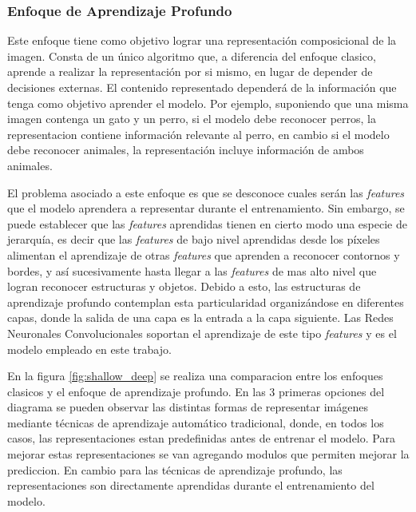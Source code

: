 \documentclass[a4paper,11pt,spanish]{book}
\begin{document}
      \subsubsection{Enfoque de Aprendizaje Profundo}
	Este enfoque tiene como objetivo lograr una representación composicional de la imagen. Consta de un único algoritmo que, a diferencia del enfoque clasico, aprende a realizar 
	la representación por si mismo, en lugar de depender de decisiones externas.
	El contenido representado dependerá de la información que tenga como objetivo aprender el modelo. Por ejemplo, suponiendo que una misma imagen contenga un gato y un perro,
	si el modelo debe reconocer perros, la representacion contiene información relevante al perro, en cambio si el modelo debe reconocer animales, la representación incluye
	información de ambos animales.

	El problema asociado a este enfoque es que se desconoce cuales serán las \emph{features} que el modelo aprendera a representar durante el entrenamiento.
	Sin embargo, se puede establecer que las \emph{features} aprendidas tienen en cierto modo una especie de jerarquía, es decir que las \emph{features} de bajo nivel aprendidas desde los píxeles
	alimentan el aprendizaje de otras \emph{features} que aprenden a reconocer contornos y bordes, y así sucesivamente hasta llegar a las \emph{features} de mas alto nivel
	que logran reconocer estructuras y objetos. Debido a esto, las estructuras de aprendizaje profundo contemplan esta particularidad organizándose en diferentes capas,
	donde la salida de una capa es la entrada a la capa siguiente. Las Redes Neuronales Convolucionales soportan el aprendizaje de este tipo \emph{features}
	y es el modelo empleado en este trabajo. 

	En la figura \ref{fig:shallow_deep} se realiza una comparacion entre los enfoques clasicos y el enfoque de aprendizaje profundo.  En las 3 primeras opciones del diagrama se
	pueden observar las distintas formas de representar imágenes mediante técnicas de aprendizaje automático tradicional,
	donde, en todos los casos, las representaciones estan predefinidas antes de entrenar el modelo. Para mejorar estas representaciones se van agregando modulos 
	que permiten mejorar la prediccion.
	En cambio para las técnicas de aprendizaje profundo, las representaciones son directamente aprendidas durante el entrenamiento del modelo.
\end{document}
